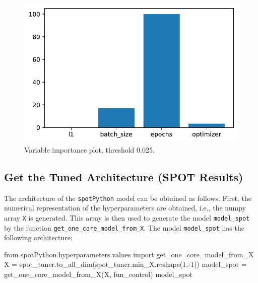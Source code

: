 \documentclass[
  letterpaper,
  DIV=11,
  numbers=noendperiod]{scrreprt}
\newenvironment{Shaded}{\begin{snugshade}}{\end{snugshade}}
\newcommand{\DecValTok}[1]{\textcolor[rgb]{0.68,0.00,0.00}{#1}}
\newcommand{\ImportTok}[1]{\textcolor[rgb]{0.00,0.46,0.62}{#1}}
\newcommand{\NormalTok}[1]{\textcolor[rgb]{0.00,0.23,0.31}{#1}}
\newcommand{\OperatorTok}[1]{\textcolor[rgb]{0.37,0.37,0.37}{#1}}
\begin{document}
\begin{figure}[H]

{\centering \includegraphics{14_spot_ray_hpt_torch_cifar10_files/figure-pdf/cell-27-output-1.pdf}

}

\caption{Variable importance plot, threshold 0.025.}

\end{figure}

\hypertarget{sec-get-spot-results-14}{%
\subsection{Get the Tuned Architecture (SPOT
Results)}\label{sec-get-spot-results-14}}

The architecture of the \texttt{spotPython} model can be obtained as
follows. First, the numerical representation of the hyperparameters are
obtained, i.e., the numpy array \texttt{X} is generated. This array is
then used to generate the model \texttt{model\_spot} by the function
\texttt{get\_one\_core\_model\_from\_X}. The model \texttt{model\_spot}
has the following architecture:

\begin{Shaded}
\begin{Highlighting}[]
\ImportTok{from}\NormalTok{ spotPython.hyperparameters.values }\ImportTok{import}\NormalTok{ get\_one\_core\_model\_from\_X}
\NormalTok{X }\OperatorTok{=}\NormalTok{ spot\_tuner.to\_all\_dim(spot\_tuner.min\_X.reshape(}\DecValTok{1}\NormalTok{,}\OperatorTok{{-}}\DecValTok{1}\NormalTok{))}
\NormalTok{model\_spot }\OperatorTok{=}\NormalTok{ get\_one\_core\_model\_from\_X(X, fun\_control)}
\NormalTok{model\_spot}
\end{Highlighting}
\end{Shaded}
\end{document}
